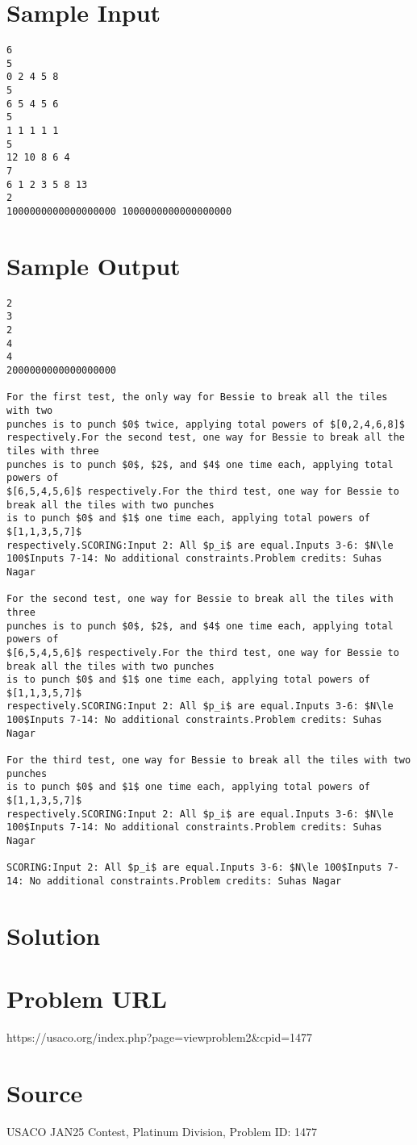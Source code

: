 \documentclass[12pt]{article}
\begin{document}
\section*{Sample Input}
\begin{verbatim}
6
5
0 2 4 5 8
5
6 5 4 5 6
5
1 1 1 1 1
5
12 10 8 6 4
7
6 1 2 3 5 8 13
2
1000000000000000000 1000000000000000000
\end{verbatim}

\section*{Sample Output}
\begin{verbatim}
2
3
2
4
4
2000000000000000000

For the first test, the only way for Bessie to break all the tiles with two
punches is to punch $0$ twice, applying total powers of $[0,2,4,6,8]$
respectively.For the second test, one way for Bessie to break all the tiles with three
punches is to punch $0$, $2$, and $4$ one time each, applying total powers of
$[6,5,4,5,6]$ respectively.For the third test, one way for Bessie to break all the tiles with two punches
is to punch $0$ and $1$ one time each, applying total powers of $[1,1,3,5,7]$
respectively.SCORING:Input 2: All $p_i$ are equal.Inputs 3-6: $N\le 100$Inputs 7-14: No additional constraints.Problem credits: Suhas Nagar

For the second test, one way for Bessie to break all the tiles with three
punches is to punch $0$, $2$, and $4$ one time each, applying total powers of
$[6,5,4,5,6]$ respectively.For the third test, one way for Bessie to break all the tiles with two punches
is to punch $0$ and $1$ one time each, applying total powers of $[1,1,3,5,7]$
respectively.SCORING:Input 2: All $p_i$ are equal.Inputs 3-6: $N\le 100$Inputs 7-14: No additional constraints.Problem credits: Suhas Nagar

For the third test, one way for Bessie to break all the tiles with two punches
is to punch $0$ and $1$ one time each, applying total powers of $[1,1,3,5,7]$
respectively.SCORING:Input 2: All $p_i$ are equal.Inputs 3-6: $N\le 100$Inputs 7-14: No additional constraints.Problem credits: Suhas Nagar

SCORING:Input 2: All $p_i$ are equal.Inputs 3-6: $N\le 100$Inputs 7-14: No additional constraints.Problem credits: Suhas Nagar
\end{verbatim}

\section*{Solution}


\section*{Problem URL}
https://usaco.org/index.php?page=viewproblem2&cpid=1477

\section*{Source}
USACO JAN25 Contest, Platinum Division, Problem ID: 1477
\end{document}
